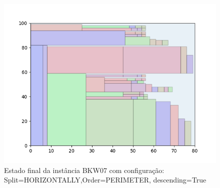 \begin{figure}[H]
    \centering
    \caption[]{Estado final da instância BKW07 com configuração: Split=HORIZONTALLY,Order=PERIMETER, descending=True}
    \label{fig:bkw07-horizontally-perimeter-true}
    \includegraphics[scale=0.5]{output/figures/bkw/bkw07/horizontally/perimeter/true/00}
\end{figure}